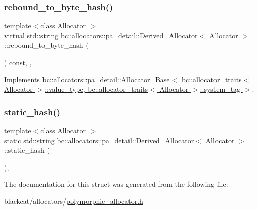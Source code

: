 \subsubsection{\texorpdfstring{rebound\+\_\+to\+\_\+byte\+\_\+hash()}{rebound\_to\_byte\_hash()}}
{\footnotesize\ttfamily template$<$class Allocator $>$ \\
virtual std\+::string \hyperlink{structbc_1_1allocators_1_1pa__detail_1_1Derived__Allocator}{bc\+::allocators\+::pa\+\_\+detail\+::\+Derived\+\_\+\+Allocator}$<$ \hyperlink{classbc_1_1allocators_1_1Allocator}{Allocator} $>$\+::rebound\+\_\+to\+\_\+byte\+\_\+hash (\begin{DoxyParamCaption}{ }\end{DoxyParamCaption}) const\hspace{0.3cm}{\ttfamily [inline]}, {\ttfamily [final]}, {\ttfamily [virtual]}}



Implements \hyperlink{structbc_1_1allocators_1_1pa__detail_1_1Allocator__Base_a2a90a282042dc49c3c43306b2766ba83}{bc\+::allocators\+::pa\+\_\+detail\+::\+Allocator\+\_\+\+Base$<$ bc\+::allocator\+\_\+traits$<$ Allocator $>$\+::value\+\_\+type, bc\+::allocator\+\_\+traits$<$ Allocator $>$\+::system\+\_\+tag $>$}.

\mbox{\label{structbc_1_1allocators_1_1pa__detail_1_1Derived__Allocator_ac8b23f4729cf661a1bb874d1ff3fb83e}} 
\subsubsection{\texorpdfstring{static\+\_\+hash()}{static\_hash()}}
{\footnotesize\ttfamily template$<$class Allocator $>$ \\
static std\+::string \hyperlink{structbc_1_1allocators_1_1pa__detail_1_1Derived__Allocator}{bc\+::allocators\+::pa\+\_\+detail\+::\+Derived\+\_\+\+Allocator}$<$ \hyperlink{classbc_1_1allocators_1_1Allocator}{Allocator} $>$\+::static\+\_\+hash (\begin{DoxyParamCaption}{ }\end{DoxyParamCaption})\hspace{0.3cm}{\ttfamily [inline]}, {\ttfamily [static]}}



The documentation for this struct was generated from the following file\+:\begin{DoxyCompactItemize}
\item 
blackcat/allocators/\hyperlink{polymorphic__allocator_8h}{polymorphic\+\_\+allocator.\+h}\end{DoxyCompactItemize}
